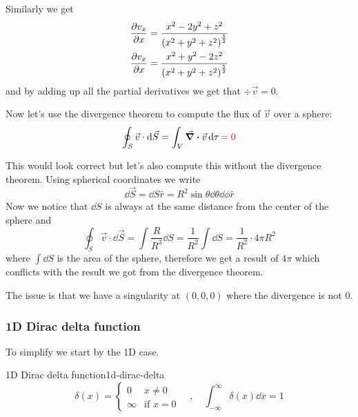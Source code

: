 \documentclass[12pt]{extarticle}
\begin{document}
Similarly we get
\begin{align}
	\pdv{v_x}{x} & = \frac{x^2 - 2y^2 + z^2}{\left( x^2 + y^2 + z^2\right)^{\frac{5}{2}}} \\
	\pdv{v_x}{x} & = \frac{x^2 + y^2 - 2z^2}{\left( x^2 + y^2 + z^2\right)^{\frac{5}{2}}}
\end{align}
and by adding up all the partial derivatives we get that $\div \vec v = 0$.

Now let's use the divergence theorem to compute the flux of $\vec v$ over a sphere:
\begin{equation}
	\oint_S \vec v \cdot \dd{\vec S} = \int_V \div \vec v \dd{\tau} {\color{red}= 0}
	\label{eq:dirac-wrong}
\end{equation}

This would look correct but let's also compute this without the divergence theorem.
Using spherical coordinates we write
\begin{equation}
	\dd{\vec S} = \dd{S}\hat r = R^2 \sin\theta \dd{\theta} \dd{\phi} \hat r
\end{equation}
Now we notice that $\dd{S}$ is always at the same distance from the center of the sphere and
\begin{equation}
	\oint_S \vec v \cdot \dd{\vec S} = \int \frac{R}{R^3} \dd{S} = \frac{1}{R^2} \int \dd{S} = \frac{1}{R^2} \cdot 4 \pi R^2
\end{equation}
where $\int \dd{S}$ is the area of the sphere, therefore we get a result of $4\pi$ which conflicts with the result we got from the divergence theorem.

The issue is that we have a singularity at $(0,0,0)$ where the divergence is not $0$.

\subsubsection{1D Dirac delta function}

To simplify we start by the 1D case.
\begin{definition}{1D Dirac delta function}{1d-dirac-delta}
	\begin{equation}
		\delta(x) = \begin{cases}
			0      & x \ne 0          \\
			\infty & \text{if } x = 0
		\end{cases}  \quad, \quad \int_{-\infty}^{\infty} \delta(x) \dd{x} = 1
	\end{equation}
\end{definition}
\end{document}
